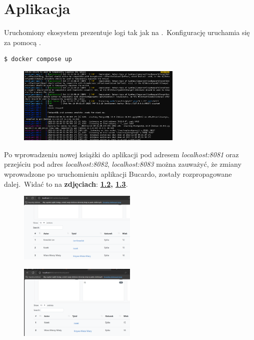 \chapter{Aplikacja}
Uruchomiony ekosystem prezentuje logi tak jak na .\ Konfigurację uruchamia się za pomocą .

\begin{lstlisting}[language=bash, label={lst:dcc}, caption={Uruchomienie Docker Compose}]
    $ docker compose up
\end{lstlisting}

\begin{figure}[H]
    \centering
    \includegraphics[width=0.7\textwidth]{images/compose}
    \label{fig:dcc}
\end{figure}

Po wprowadzeniu nowej książki do aplikacji pod adresem \textit{localhost:8081} oraz przejściu pod adres \textit{localhost:8082}, \textit{localhost:8083} można zauważyć, że zmiany wprowadzone po uruchomieniu aplikacji Bucardo, zostały rozpropagowane dalej.\ Widać to na \textbf{zdjęciach}: \textbf{\ref{fig:aa}, \ref{fig:aaa}}.

\begin{figure}[H]
    \centering
    \includegraphics[width=0.5\textwidth]{images/a1}
    \label{fig:aa}
\end{figure}

\begin{figure}[H]
    \centering
    \includegraphics[width=0.5\textwidth]{images/a2}
    \label{fig:aaa}
\end{figure}

